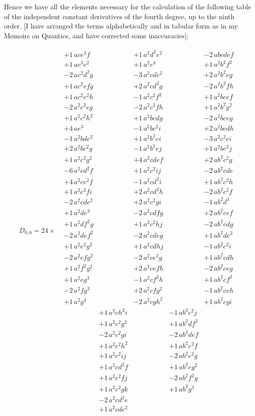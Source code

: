 \documentclass[12pt,a4paper]{article}
\begin{document}
Hence we have all the elements necessary for the calculation of the following table
of the independent constant derivatives of the fourth degree, up to the ninth order. [I
have arranged the terms alphabetically and in tabular form as in my Memoirs on
Quantics, and have corrected some inaccuracies];

\begin{gather*}
D_{0,0} = 24\times\begin{aligned}
&+1\, ace^3f &&+1\, a^2d^2e^2 &&-2\, abcdef\\
&+1\, ac^3e^2 &&+1\, a^2e^4 &&+1\, a^2b^2f^2\\
&-2\, ac^2d^2g &&-3\, a^2cde^2 &&+2\, a^2b^2eg\\
&+1\, ac^2efg &&+2\, a^2cd^2g &&-2\, a^2b^2fh\\
&+1\, ac^2e^2h &&-1\, a^2c^2f^2 &&+1\, a^2bcef\\
&-2\, a^2c^2eg &&-2\, a^2c^2fh &&+1\, a^2b^2g^2\\
&+1\, a^2c^2h^2 &&+1\, a^2bcdg &&-2\, a^2bceg\\
&+4\, ae^3 &&-1\, a^2bc^2i &&+2\, a^2bcdh\\
&-1\, a^2bde^2 &&+1\, a^2b^2ei &&-3\, a^2c^2ei\\
&+2\, a^2bc^2g &&-1\, a^2b^2ej &&+1\, a^2bc^2j\\
&+1\, a^2c^2g^2 &&+4\, a^2cdef &&+2\, ab^2c^2g\\
&-6\, a^2cd^2f &&+1\, a^2c^2ij &&-2\, ab^2cde\\
&+4\, a^2ce^2f &&-1\, a^2cd^2i &&+1\, ab^2c^2h\\
&+1\, a^2c^2fi &&+2\, a^2cd^2h &&-2\, ab^2c^2f\\
&-2\, a^2cde^2 &&+2\, a^2c^2gi &&-1\, ab^2d^3\\
&+1\, a^2de^3 &&-2\, a^2cdfg &&+2\, ab^2cef\\
&+1\, a^2df^2g &&+1\, a^2c^2hj &&-2\, ab^2cdg\\
&-2\, a^2def^2 &&-2\, a^2cdeg &&+1\, ab^2de^2\\
&+1\, a^2e^2g^2 &&+1\, a^2cdhj &&-1\, ab^2c^2i\\
&-2\, a^2efg^2 &&-2\, a^2ce^2g &&+1\, ab^2cdh\\
&+1\, a^2f^2g^2 &&+2\, a^2cefh &&-2\, ab^2ceg\\
&+1\, a^2eg^3 &&-1\, a^2cf^2h &&+1\, ab^2cf^2\\
&-2\, a^2fg^3 &&+2\, a^2cfg^2 &&-1\, ab^2ceh\\
&+1\, a^2g^4 &&-2\, a^2cgh^2 &&+1\, ab^2cgi\\
&&+1\, a^2ch^2i &&-1\, ab^2c^2j\\
&&+1\, a^2c^2g^2 &&+1\, ab^2df^2\\
&&-2\, a^2c^2gi &&-2\, ab^2def\\
&&+1\, a^2c^2h^2 &&+1\, ab^2e^2f\\
&&+1\, a^2c^2ij &&-2\, ab^2e^2g\\
&&+1\, a^2cd^2f &&+1\, ab^2eg^2\\
&&+1\, a^2c^2fj &&-2\, ab^2f^2g\\
&&+1\, a^2c^2gk &&+1\, ab^2g^3\\
&&-2\, a^2cd^2e &&\\
&&+1\, a^2cde^2 &
\end{aligned}
\end{gather*}
\end{document}
